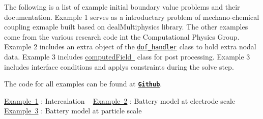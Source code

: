 The following is a list of example initial boundary value problems and their documentation. Example 1 serves as a introductary problem of mechano-\/chemical coupling exmaple built based on deal\+Multiphysics library. The other examples come from the various research code int the Computational Physics Group. Example 2 includes an extra object of the \href{https://www.dealii.org/8.5.0/doxygen/deal.II/classDoFHandler.html}{\tt dof\+\_\+handler} class to hold extra nodal data. Example 3 includes \mbox{\hyperlink{classcomputed_field}{computed\+Field }} class for post processing. Example 3 includes interface conditions and applys constraints during the solve step.

The code for all examples can be found at \href{https://github.com/mechanoChem/mechanoChemFEM/tree/example}{\tt {\bfseries Github}}.

\mbox{\hyperlink{_intercalation}{Example 1}} \+: Intercalation ~\newline
 \mbox{\hyperlink{battery_electrode_scale}{Example 2}} \+: Battery model at electrode scale~\newline
 \mbox{\hyperlink{battery_particle}{Example 3}} \+: Battery model at particle scale~\newline
